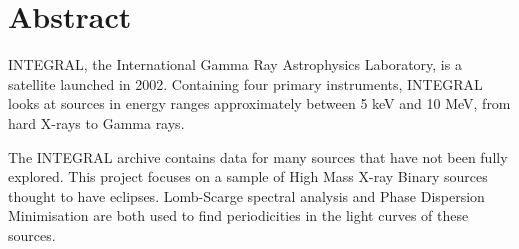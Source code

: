 

\begingroup
\let\clearpage\relax
\let\cleardoublepage\relax
\let\cleardoublepage\relax

\chapter*{Abstract} %

INTEGRAL, the International Gamma Ray Astrophysics Laboratory, is a satellite launched in 2002. Containing four primary instruments, INTEGRAL looks at sources in energy ranges approximately between 5 keV and 10 MeV, from hard X-rays to Gamma rays. 

The INTEGRAL archive contains data for many sources that have not been fully explored. This project focuses on a sample of High Mass X-ray Binary sources thought to have eclipses. Lomb-Scarge spectral analysis and Phase Dispersion Minimisation are both used to find periodicities in the light curves of these sources. 

\endgroup			

\vfill